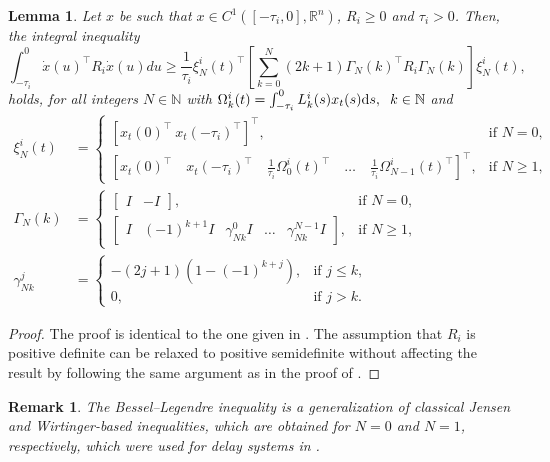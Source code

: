\documentclass[12pt]{article}
\newtheorem{lemma}{Lemma}
\newtheorem{remark}{Remark}
\begin{document}
\begin{lemma}\label{lemma:legendre}
Let $x$ be such that 
$x \in C^1([-\tau_i,0],\mathbb{R}^{n})$, $R_i\geqslant0$ and $\tau_i> 0$. 
Then, the 
integral inequality
\begin{equation}\label{eq:bessel}
\int_{-\tau_i}^{0} \dot{x}(u)^\top R_i\dot{x}
(u)du \geq \frac{1}{\tau_i}\xi_{N}^i(t)^{\top} \left[ 
\sum_{k=0}^{N} (2k+1) \Gamma_{N}(k)^\top R_i 
\Gamma_N(k) \right] \xi^i_{N}(t), 
\end{equation}
holds, for all integers $N \in 
\mathbb{N}$ with $\Omega^i_k(t)= \int_{-\tau_i}^0L_k^i(s)x_t(s)\mathrm{d}s, \hspace{2mm} k\in \mathbb{N}$ and 
\begin{align*}
\xi_{N}^i(t) &= 
\begin{cases} 
[x_t(0)^\top \ x_t(-\tau_i)^\top]^\top, & \text{if } N = 
0, \\
\left[ x_t(0)^\top \quad x_t(-\tau_i)^\top \quad 
\frac{1}{\tau_i}\Omega_0^{i}(t)^\top\quad \dots 
\quad \frac{1}{\tau_i}\Omega_{N-1}^{i}(t)^\top
\right]^\top, & \text{if } N \geq 1,
\end{cases}\\
\Gamma_N(k) &= 
\begin{cases} 
\begin{bmatrix} I & -I \end{bmatrix}, 
& \text{if } N = 0, \\
\begin{bmatrix} I & (-1)^{k+1}I & 
\gamma_{Nk}^0 I & \dots & 
\gamma_{Nk}^{N-1}I \end{bmatrix}, & 
\text{if } N \geq  1,
\end{cases}\\
\gamma_{Nk}^j &= 
\begin{cases} 
-(2j+1)(1 - (-1)^{k+j}), & \text{if } 
j \leq k, \\
0, & \text{if } j > k.
\end{cases}
\end{align*}
\end{lemma}
\begin{proof}
The proof is identical to the one given 
in \cite{seuret2015hierarchy}. The assumption that 
$R_i$ is positive definite can be relaxed to positive semidefinite 
without affecting the result by following the same argument as in the proof of  \cite[Lemma 2.2]{haskouki2026delaydependentpassivitystabilitylinear}. 
\end{proof}
\begin{remark}
The Bessel–Legendre inequality is a generalization of classical Jensen and Wirtinger-based
inequalities, which are obtained for $N=0$ and $N=1$, respectively, which were used for delay systems in \cite{seuret2013wirtinger,Fridman2014}.
\end{remark}
\end{document}
